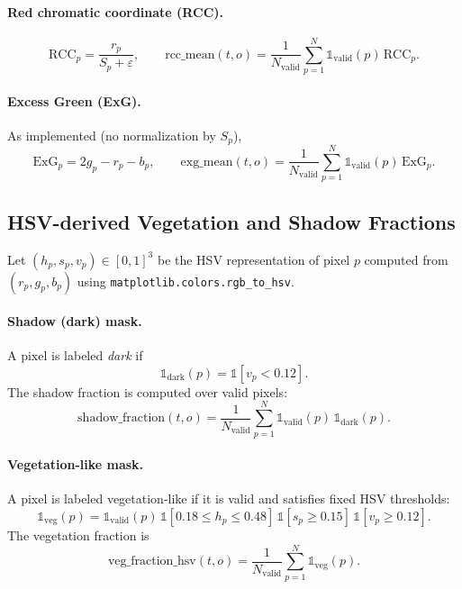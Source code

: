 \paragraph{Red chromatic coordinate (RCC).}
\begin{equation}
\mathrm{RCC}_p = \frac{r_p}{S_p+\varepsilon},
\qquad
\mathrm{rcc\_mean}(t,o) = \frac{1}{N_{\mathrm{valid}}}\sum_{p=1}^{N} \mathbb{1}_{\mathrm{valid}}(p)\,\mathrm{RCC}_p.
\end{equation}

\paragraph{Excess Green (ExG).}
As implemented (no normalization by $S_p$),
\begin{equation}
\mathrm{ExG}_p = 2g_p - r_p - b_p,
\qquad
\mathrm{exg\_mean}(t,o)=\frac{1}{N_{\mathrm{valid}}}\sum_{p=1}^{N}\mathbb{1}_{\mathrm{valid}}(p)\,\mathrm{ExG}_p.
\end{equation}

\subsection{HSV-derived Vegetation and Shadow Fractions}

Let $(h_p,s_p,v_p)\in[0,1]^3$ be the HSV representation of pixel $p$ computed from $(r_p,g_p,b_p)$
using \texttt{matplotlib.colors.rgb\_to\_hsv}.

\paragraph{Shadow (dark) mask.}
A pixel is labeled \emph{dark} if
\begin{equation}
\mathbb{1}_{\mathrm{dark}}(p) = \mathbb{1}[v_p < 0.12].
\end{equation}
The shadow fraction is computed over valid pixels:
\begin{equation}
\mathrm{shadow\_fraction}(t,o)=\frac{1}{N_{\mathrm{valid}}}\sum_{p=1}^{N} \mathbb{1}_{\mathrm{valid}}(p)\,\mathbb{1}_{\mathrm{dark}}(p).
\end{equation}

\paragraph{Vegetation-like mask.}
A pixel is labeled vegetation-like if it is valid and satisfies fixed HSV thresholds:
\begin{equation}
\mathbb{1}_{\mathrm{veg}}(p)=\mathbb{1}_{\mathrm{valid}}(p)\,\mathbb{1}[0.18\le h_p\le 0.48]\,\mathbb{1}[s_p\ge 0.15]\,\mathbb{1}[v_p\ge 0.12].
\end{equation}
The vegetation fraction is
\begin{equation}
\mathrm{veg\_fraction\_hsv}(t,o)=\frac{1}{N_{\mathrm{valid}}}\sum_{p=1}^{N}\mathbb{1}_{\mathrm{veg}}(p).
\end{equation}

